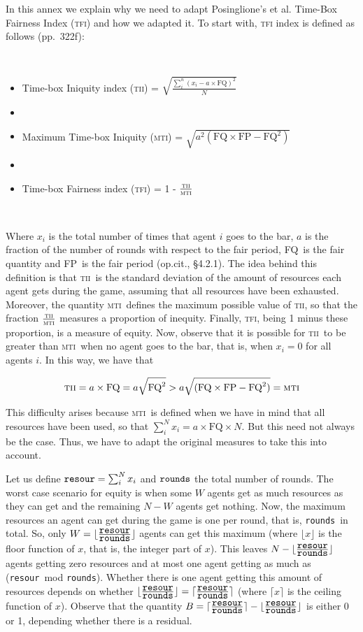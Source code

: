 \documentclass{minimal}
\newcommand{\tfi}{\textsc{tfi}}
\newcommand{\tii}{\textsc{tii}}
\newcommand{\mti}{\textsc{mti}}
\newcommand{\FQ}{\mbox{FQ}}
\newcommand{\FP}{\mbox{FP}}
\newcommand{\R}{\mbox{\texttt{resour}}}
\newcommand{\ro}{\mbox{\texttt{rounds}}}
\newcommand{\fl}[1]{\lfloor#1\rfloor}
\newcommand{\cl}[1]{\lceil#1\rceil}
\begin{document}
In this annex we explain why we need to adapt Posinglione's et al. Time-Box Fairness Index (\tfi) and how we adapted it. To start with, \textsc{tfi} index is defined as follows (pp.~322f):

\

\begin{itemize}
\item[] Time-box Iniquity index (\tii) = $\displaystyle{\sqrt{\frac{\sum_i^n(x_i-a\times\FQ)^2}{N}}}$
\item[]
\item[] Maximum Time-box Iniquity (\mti) = $\displaystyle{\sqrt{a^2(\FQ\times\FP-\FQ^2)}}$
\item[]
\item[] Time-box Fairness index (\tfi) = 1 - $\frac{\tii}{\mti}$
\end{itemize}

\

Where $x_i$ is the total number of times that agent $i$ goes to the bar, $a$ is the fraction of the number of rounds with respect to the fair period, \FQ\ is the fair quantity and \FP\ is the fair period (op.cit., \S4.2.1). The idea behind this definition is that \tii\ is the standard deviation of the amount of resources each agent gets during the game, assuming that all resources have been exhausted. Moreover, the quantity \mti\ defines the maximum possible value of \tii, so that the fraction $\frac{\tii}{\mti}$ measures a proportion of inequity. Finally, \tfi, being 1 minus these proportion, is a measure of equity. Now, observe that it is possible for \tii\ to be greater than \mti\ when no agent goes to the bar, that is, when $x_i=0$ for all agents $i$. In this way, we have that

\[
\tii = a\times\FQ = a\sqrt{\FQ^2}> a\sqrt{(\FQ\times\FP - \FQ^2)} = \mti
\]

This difficulty arises because \mti\ is defined when we have in mind that all resources have been used, so that $\sum_i^N x_i = a\times\FQ\times N$. But this need not always be the case. Thus, we have to adapt the original measures to take this into account.

Let us define $\R=\sum_i^N x_i$ and $\ro$ the total number of rounds. The worst case scenario for equity is when some $W$ agents get as much resources as they can get and the remaining $N-W$ agents get nothing. Now, the maximum resources an agent can get during the game is one per round, that is, \ro\ in total. So, only $W=\fl{\frac{\R}{\ro}}$ agents can get this maximum (where $\fl{x}$ is the floor function of $x$, that is, the integer part of $x$). This leaves $N-\fl{\frac{\R}{\ro}}$ agents getting zero resources and at most one agent getting as much as (\R\ mod \ro). Whether there is one agent getting this amount of resources depends on whether $\fl{\frac{\R}{\ro}}=\cl{\frac{\R}{\ro}}$ (where $\cl{x}$ is the ceiling function of $x$). Observe that the quantity $B=\cl{\frac{\R}{\ro}} - \fl{\frac{\R}{\ro}}$ is either 0 or 1, depending whether there is a residual.
\end{document}
